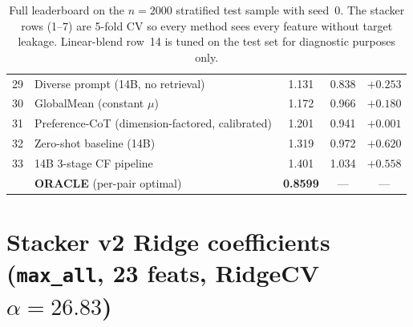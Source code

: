\documentclass[11pt,a4paper]{article}
\newcommand{\best}[1]{\textcolor{goodgreen}{\textbf{#1}}}
\newcommand{\worst}[1]{\textcolor{badred}{#1}}
\begin{document}
\begin{table}[H]
\begin{tabular}{rlccc}
29 & Diverse prompt (14B, no retrieval)                                              & 1.131         & 0.838  & $+0.253$ \\
30 & GlobalMean (constant $\mu$)                                                     & 1.172         & 0.966  & $+0.180$ \\
31 & Preference-CoT (dimension-factored, calibrated)                                 & 1.201         & 0.941  & $+0.001$ \\
32 & Zero-shot baseline (14B)                                                        & 1.319         & 0.972  & $+0.620$ \\
33 & 14B 3-stage CF pipeline                                                          & \worst{1.401} & 1.034  & $+0.558$ \\
\midrule
   & \textbf{ORACLE} (per-pair optimal)                                              & \best{0.8599} & ---    & --- \\
\bottomrule
\end{tabular}
\caption{Full leaderboard on the $n{=}2000$ stratified test sample with
seed~0. The stacker rows (1--7) are 5-fold CV so every method sees every
feature without target leakage. Linear-blend row~14 is tuned on the test
set for diagnostic purposes only.}
\label{tab:full_leaderboard}
\end{table}

\section{Stacker v2 Ridge coefficients (\texttt{max\_all}, 23 feats, RidgeCV $\alpha{=}26.83$)}
\label{app:v2_coefs}
\end{document}
